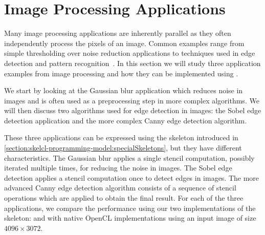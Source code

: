 \section{Image Processing Applications}
\label{sec:imageProcessing}
Many image processing applications are inherently parallel as they often independently process the pixels of an image.
Common examples range from simple thresholding over noise reduction applications to techniques used in edge detection and pattern recognition~\cite{Umbaugh1997}.
In this section we will study three application examples from image processing and how they can be implemented using \SkelCL.

We start by looking at the Gaussian blur application which reduces noise in images and is often used as a preprocessing step in more complex algorithms.
We will then discuss two algorithms used for edge detection in images:
the Sobel edge detection application and the more complex Canny edge detection algorithm.

These three applications can be expressed using the \stencil skeleton introduced in \autoref{section:skelcl-programming-model:specialSkeletons}, but they have different characteristics.
The Gaussian blur applies a single stencil computation, possibly iterated multiple times, for reducing the noise in images.
The Sobel edge detection applies a stencil computation once to detect edges in images.
The more advanced Canny edge detection algorithm consists of a sequence of stencil operations which are applied to obtain the final result.
For each of the three applications, we compare the performance using our two implementations of the \stencil skeleton:
 and  with native OpenCL implementations using an input image of size $4096 \times 3072$.










